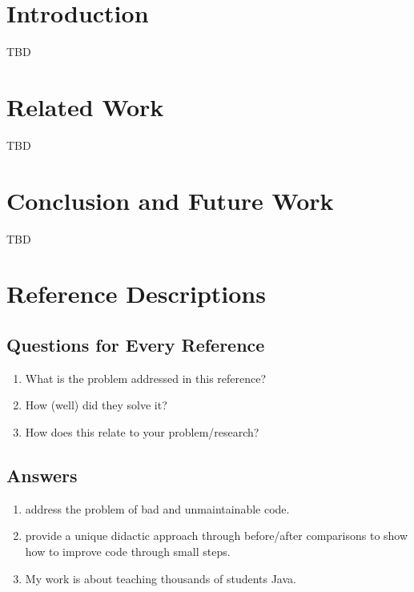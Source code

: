 \section{Introduction}

TBD

\section{Related Work}

TBD

\section{Conclusion and Future Work}

TBD

\section{Reference Descriptions}

\subsection{Questions for Every Reference}

\begin{enumerate}
	\item What is the problem addressed in this reference?
	\item How (well) did they solve it?
	\item How does this relate to your problem/research?
\end{enumerate}

\subsection{Answers}

\begin{enumerate}
	\item \cite{Harrer2018} address the problem of bad and unmaintainable code.
	\item \cite{Harrer2018} provide a unique didactic approach through before/after comparisons to show how to improve code through small steps.
	\item My work is about teaching thousands of students Java.
\end{enumerate}